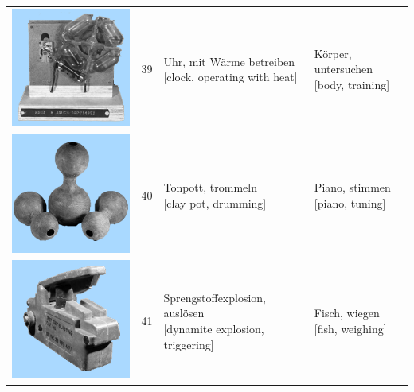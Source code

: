\documentclass[
  english,
  doc,12pt,twoside,floatsintext]{apa7}
\begin{document}
\begin{center}
\begin{ThreePartTable}
{\begin{longtable}{llll}
\includegraphics[valign=c, scale=0.23]{../materials/unfamiliar/39.png} & 39 & \makecell[l]{Uhr, mit Wärme betreiben\\{[clock, operating with heat]}} & \makecell[l]{Körper, untersuchen\\{[body, training]}}\\
\includegraphics[valign=c, scale=0.23]{../materials/unfamiliar/40.png} & 40 & \makecell[l]{Tonpott, trommeln\\{[clay pot, drumming]}} & \makecell[l]{Piano, stimmen\\{[piano, tuning]}}\\
\includegraphics[valign=c, scale=0.23]{../materials/unfamiliar/41.png} & 41 & \makecell[l]{Sprengstoffexplosion, auslösen\\{[dynamite explosion, triggering]}} & \makecell[l]{Fisch, wiegen\\{[fish, weighing]}}\\

\end{longtable}}
\end{ThreePartTable}
\end{center}
\end{document}
